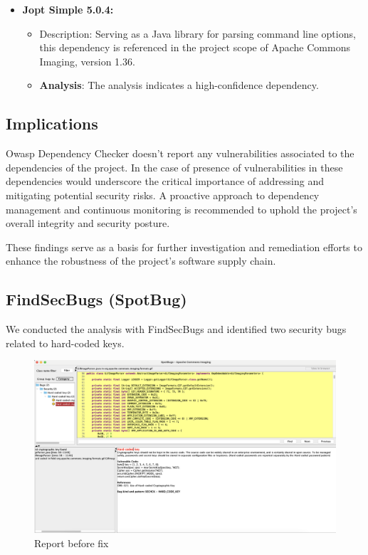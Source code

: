 \documentclass[sigconf]{acmart}
\begin{document}
\begin{itemize}
    \item \textbf{Jopt Simple 5.0.4:}
        \begin{itemize}
            \item Description: Serving as a Java library for parsing command line options, this dependency is referenced in the project scope of Apache Commons Imaging, version 1.36.
            \item \textbf{Analysis}: The analysis indicates a high-confidence dependency.
        \end{itemize}
\end{itemize}

\subsection{Implications}

Owasp Dependency Checker doesn't report any vulnerabilities associated to the dependencies of the project. In the case of presence of vulnerabilities in these dependencies would underscore the critical importance of addressing and mitigating potential security risks. A proactive approach to dependency management and continuous monitoring is recommended to uphold the project's overall integrity and security posture.

These findings serve as a basis for further investigation and remediation efforts to enhance the robustness of the project's software supply chain.


\subsection{FindSecBugs (SpotBug)}

We conducted the analysis with FindSecBugs and identified two security bugs related to hard-coded keys. 

\begin{figure}[h!]
    \centering
    \includegraphics[width=1\linewidth]{reportFindSecBugs.png}
    \caption{Report before fix}
    \label{fig:enter-label}
\end{figure}
\end{document}
